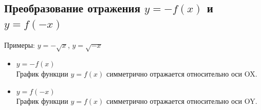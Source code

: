 \subsection{Преобразование отражения  $y = - f(x)$ и $y = f (-x)$}

Примеры: $y=-\sqrt{x}$, $y=\sqrt{-x}$

\begin{itemize}
    \item $y = - f(x)$ \\
    График функции $y = f (x)$ симметрично отражается относительно оси OX.
    \item $y = f (-x)$ \\
    График функции   $y = f (x)$ симметрично отражается относительно оси OY.
\end{itemize}

\begin{figure}[h!]
	\begin{minipage}[h]{0.49\linewidth}
	\end{minipage}
	\hfill
	\begin{minipage}[h]{0.49\linewidth}
	\end{minipage}
	\label{ris:image1}
\end{figure}

